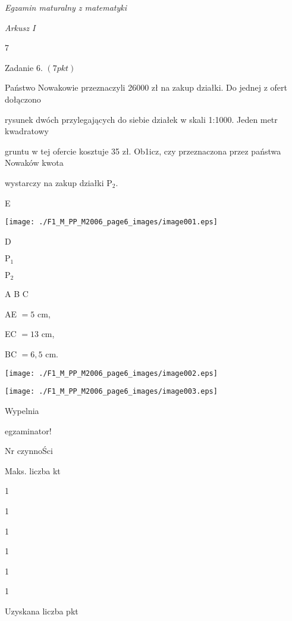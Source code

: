 \documentclass[a4paper,12pt]{article}
\begin{document}
{\it Egzamin maturalny z matematyki}

{\it Arkusz I}

7

Zadanie 6. $(7pkt)$

Państwo Nowakowie przeznaczyli 26000 zł na zakup działki. Do jednej z ofert dołączono

rysunek dwóch przylegających do siebie działek w skali 1:1000. Jeden metr kwadratowy

gruntu w tej ofercie kosztuje 35 zł. Ob1icz, czy przeznaczona przez państwa Nowaków kwota

wystarczy na zakup działki $\mathrm{P}_{2}.$

E
\begin{center}
\texttt{[image: ./F1\_M\_PP\_M2006\_page6\_images/image001.eps]}
\end{center}
D

$\mathrm{P}_{1}$

$\mathrm{P}_{2}$

A  B  C

AE $=5$ cm,

EC $=13$ cm,

BC $=6,5$ cm.
\begin{center}
\texttt{[image: ./F1\_M\_PP\_M2006\_page6\_images/image002.eps]}

\texttt{[image: ./F1\_M\_PP\_M2006\_page6\_images/image003.eps]}
\end{center}
Wypelnia

egzaminator!

Nr czynnoŚci

Maks. liczba kt

1

1

1

1

1

1

Uzyskana liczba pkt
\end{document}
